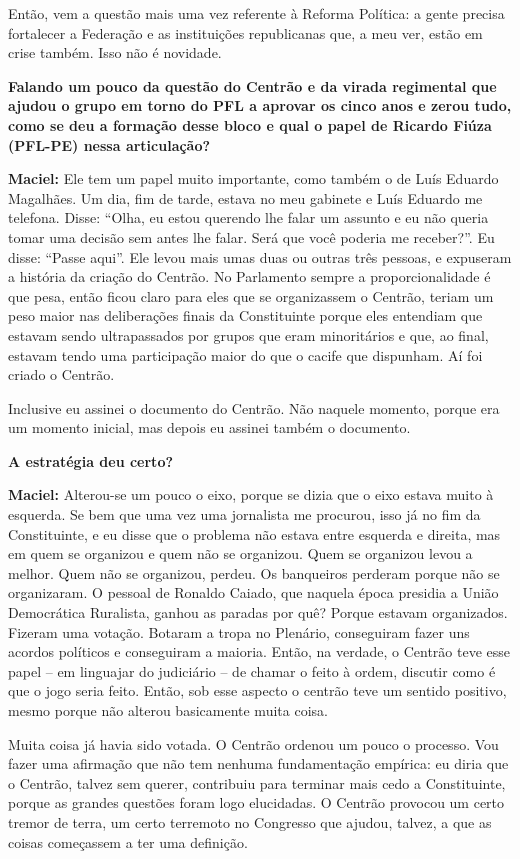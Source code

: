 Então, vem a questão mais uma vez referente à Reforma Política: a gente
precisa fortalecer a Federação e as instituições republicanas que, a meu
ver, estão em crise também. Isso não é novidade.

\textbf{Falando um pouco da questão do Centrão e da virada regimental
que ajudou o grupo em torno do PFL a aprovar os cinco anos e zerou tudo,
como se deu a formação desse bloco e qual o papel de Ricardo Fiúza
(PFL-PE) nessa articulação? }

\textbf{Maciel:} Ele tem um papel muito importante, como também o de
Luís Eduardo Magalhães. Um dia, fim de tarde, estava no meu gabinete e
Luís Eduardo me telefona. Disse: ``Olha, eu estou querendo lhe falar um
assunto e eu não queria tomar uma decisão sem antes lhe falar. Será que
você poderia me receber?''. Eu disse: ``Passe aqui''. Ele levou mais
umas duas ou outras três pessoas, e expuseram a história da criação do
Centrão. No Parlamento sempre a proporcionalidade é que pesa, então
ficou claro para eles que se organizassem o Centrão, teriam um peso
maior nas deliberações finais da Constituinte porque eles entendiam que
estavam sendo ultrapassados por grupos que eram minoritários e que, ao
final, estavam tendo uma participação maior do que o cacife que
dispunham. Aí foi criado o Centrão.

Inclusive eu assinei o documento do Centrão. Não naquele momento, porque
era um momento inicial, mas depois eu assinei também o documento.

\textbf{A estratégia deu certo?}

\textbf{Maciel:} Alterou-se um pouco o eixo, porque se dizia que o eixo
estava muito à esquerda. Se bem que uma vez uma jornalista me procurou,
isso já no fim da Constituinte, e eu disse que o problema não estava
entre esquerda e direita, mas em quem se organizou e quem não se
organizou. Quem se organizou levou a melhor. Quem não se organizou,
perdeu. Os banqueiros perderam porque não se organizaram. O pessoal de
Ronaldo Caiado, que naquela época presidia a União Democrática
Ruralista, ganhou as paradas por quê? Porque estavam organizados.
Fizeram uma votação. Botaram a tropa no Plenário, conseguiram fazer uns
acordos políticos e conseguiram a maioria. Então, na verdade, o Centrão
teve esse papel -- em linguajar do judiciário -- de chamar o feito à
ordem, discutir como é que o jogo seria feito. Então, sob esse aspecto o
centrão teve um sentido positivo, mesmo porque não alterou basicamente
muita coisa.

Muita coisa já havia sido votada. O Centrão ordenou um pouco o processo.
Vou fazer uma afirmação que não tem nenhuma fundamentação empírica: eu
diria que o Centrão, talvez sem querer, contribuiu para terminar mais
cedo a Constituinte, porque as grandes questões foram logo elucidadas. O
Centrão provocou um certo tremor de terra, um certo terremoto no
Congresso que ajudou, talvez, a que as coisas começassem a ter uma
definição.

